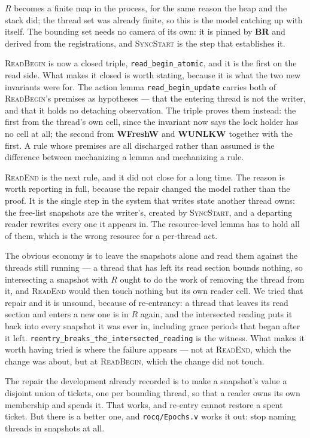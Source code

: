 $R$ becomes a finite map in the process, for the same reason the heap and the
stack did; the thread set was already finite, so this is the model catching up
with itself.  The bounding set needs no camera of its own: it is pinned by
\textbf{BR} and derived from the registrations, and \textsc{SyncStart} is the
step that establishes it.

\textsc{ReadBegin} is now a closed triple, \texttt{read\_begin\_atomic}, and it
is the first on the read side.  What makes it closed is worth stating, because
it is what the two new invariants were for.  The action lemma
\texttt{read\_begin\_update} carries both of \textsc{ReadBegin}'s premises as
hypotheses --- that the entering thread is not the writer, and that it holds no
detaching observation.  The triple proves them instead: the first from the
thread's own cell, since the invariant now says the lock holder has no cell at
all; the second from \textbf{WFreshW} and \textbf{WUNLKW} together with the
first.  A rule whose premises are all discharged rather than assumed is the
difference between mechanizing a lemma and mechanizing a rule.

\textsc{ReadEnd} is the next rule, and it did not close for a long time.  The
reason is worth reporting in full, because the repair changed the model rather
than the proof.  It is the single step in the system that writes state another
thread owns: the free-list snapshots are the writer's, created by
\textsc{SyncStart}, and a departing reader rewrites every one it appears in.
The resource-level lemma has to hold all of them, which is the wrong resource
for a per-thread act.

The obvious economy is to leave the snapshots alone and read them against the
threads still running --- a thread that has left its read section bounds
nothing, so intersecting a snapshot with $R$ ought to do the work of removing
the thread from it, and \textsc{ReadEnd} would then touch nothing but its own
reader cell.  We tried that repair and it is unsound, because of re-entrancy: a
thread that leaves its read section and enters a new one is in $R$ again, and
the intersected reading puts it back into every snapshot it was ever in,
including grace periods that began after it left.
\texttt{reentry\_breaks\_the\_intersected\_reading} is the witness.  What makes
it worth having tried is where the failure appears --- not at \textsc{ReadEnd},
which the change was about, but at \textsc{ReadBegin}, which the change did not
touch.

The repair the development already recorded is to make a snapshot's value a
disjoint union of tickets, one per bounding thread, so that a reader owns its
own membership and spends it.  That works, and re-entry cannot restore a spent
ticket.  But there is a better one, and \texttt{rocq/Epochs.v} works it out:
stop naming threads in snapshots at all.

